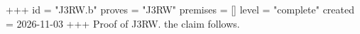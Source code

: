 +++
id = "J3RW.b"
proves = "J3RW"
premises = []
level = "complete"
created = 2026-11-03
+++
Proof of J3RW. the claim follows.
